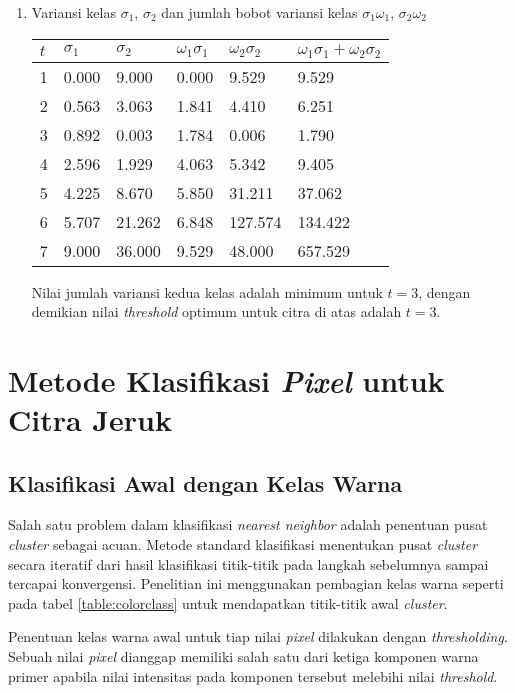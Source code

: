 \documentclass[laporan.tex]{subfiles}
\begin{document}
\begin{enumerate}
\item Variansi kelas $\sigma_1$, $\sigma_2$ dan jumlah bobot variansi kelas $\sigma_1 \omega_1$, $\sigma_2 \omega_2$ \\
\begin{tabular}{|l|l|l|l|l|l|}
\hline
$t$ & $\sigma_1$ & $\sigma_2$ & $\omega_1 \sigma_1$ & $\omega_2 \sigma_2$ & $\omega_1 \sigma_1 + \omega_2 \sigma_2$ \\
\hline
1 & 0.000 & 9.000 & 0.000 & 9.529 & 9.529 \\
2 & 0.563 & 3.063 & 1.841 & 4.410 & 6.251 \\
3 & 0.892 & 0.003 & 1.784 & 0.006 & 1.790 \\
4 & 2.596 & 1.929 & 4.063 & 5.342 & 9.405 \\
5 & 4.225 & 8.670 & 5.850 & 31.211 & 37.062 \\
6 & 5.707 & 21.262 & 6.848 & 127.574 & 134.422 \\
7 & 9.000 & 36.000 & 9.529 & 48.000 & 657.529 \\
\hline
\end{tabular}

Nilai jumlah variansi kedua kelas adalah minimum untuk $t=3$, dengan demikian nilai \emph{threshold} optimum untuk citra di atas adalah $t=3$.

\end{enumerate}


\section{Metode Klasifikasi \emph{Pixel} untuk Citra Jeruk}

\subsection{Klasifikasi Awal dengan Kelas Warna}
Salah satu problem dalam klasifikasi \emph{nearest neighbor} adalah penentuan pusat \emph{cluster} sebagai acuan. Metode standard klasifikasi menentukan pusat \emph{cluster} secara iteratif dari hasil klasifikasi titik-titik pada langkah sebelumnya sampai tercapai konvergensi. Penelitian ini menggunakan pembagian kelas warna seperti pada tabel \ref{table:colorclass} untuk mendapatkan titik-titik awal \emph{cluster}.

Penentuan kelas warna awal untuk tiap nilai \emph{pixel} dilakukan dengan \emph{thresholding}. Sebuah nilai \emph{pixel} dianggap memiliki salah satu dari ketiga komponen warna primer apabila nilai intensitas pada komponen tersebut melebihi nilai \emph{threshold}.
\end{document}
